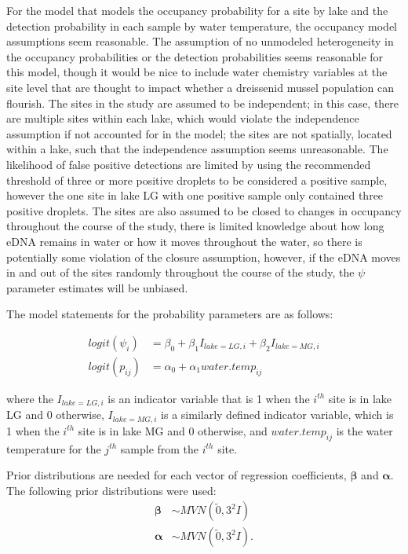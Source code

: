 \documentclass[12pt]{article}\usepackage[]{graphicx}\usepackage[]{color}
\begin{document}
For the model that models the occupancy probability for a site by lake and the detection probability in each sample by water temperature, the occupancy model assumptions seem reasonable. The assumption of no unmodeled heterogeneity in the occupancy probabilities or the detection probabilities seems reasonable for this model, though it would be nice to include water chemistry variables at the site level that are thought to impact whether a dreissenid mussel population can flourish. The sites in the study are assumed to be independent; in this case, there are multiple sites within each lake, which would violate the independence assumption if not accounted for in the model; the sites are not spatially, located within a lake, such that the independence assumption seems unreasonable. The likelihood of false positive detections are limited by using the recommended threshold of three or more positive droplets to be considered a positive sample, however the one site in lake LG with one positive sample only contained three positive droplets. The sites are also assumed to be closed to changes in occupancy throughout the course of the study, there is limited knowledge about how long eDNA remains in water or how it moves throughout the water, so there is potentially some violation of the closure assumption, however, if the eDNA moves in and out of the sites randomly throughout the course of the study, the $\psi$ parameter estimates will be unbiased. 

The model statements for the probability parameters are as follows:  

$$
\begin{aligned}
logit(\psi_i) &= \beta_0 + \beta_1I_{lake = LG, i} + \beta_2I_{lake = MG, i}\\
logit(p_{ij}) &= \alpha_0 + \alpha_1water.temp_{ij}
\end{aligned}
$$

\noindent where the $I_{lake = LG, i}$ is an indicator variable that is 1 when the $i^{th}$ site is in lake LG and 0 otherwise, $I_{lake = MG, i}$ is a similarly defined indicator variable, which is 1 when the $i^{th}$ site is in lake MG and 0 otherwise, and $water.temp_{ij}$ is the water temperature for the $j^{th}$ sample from the $i^{th}$ site. 

Prior distributions are needed for each vector of regression coefficients, $\bm\beta$ and $\bm\alpha$. The following prior distributions were used: 
$$
\begin{aligned}
\bm{\beta} &\sim MVN(\tilde 0, 3^2I)\\
\bm{\alpha} &\sim MVN(\tilde 0, 3^2I).
\end{aligned}
$$
\end{document}
